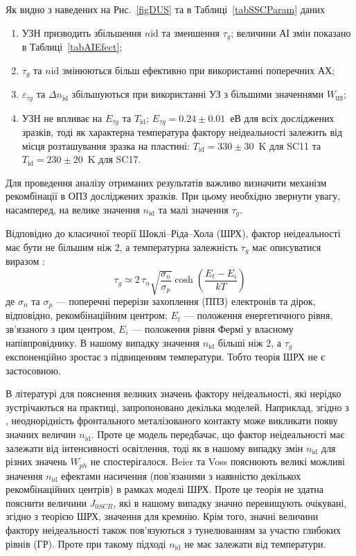 Як видно з наведених на Рис.~\ref{figDUS} та в Таблиці~\ref{tabSSCParam} даних
\begin{enumerate}[label=\asbuk*),leftmargin=0em,itemindent=1.5em]
\item УЗН призводить збільшення $n\mathrm{id}$ та зменшення $\tau_{g}$;
   величини АІ змін показано в Таблиці~\ref{tabAIEfect};
\item $\tau_{g}$ та $n\mathrm{id}$ змінюються більш ефективно при використанні поперечних АХ;
\item $\varepsilon_{\tau g}$ та $\Delta n_\mathrm{id}$ збільшуються при використанні УЗ з більшими значеннями $W_{\mathtt{US}}$;
\item УЗН не впливає на $E_{\tau g}$ та $T_\mathrm{id}$;
 $E_{\tau g}=0.24\pm0.01$~еВ для всіх досліджених зразків,
 тоді як характерна температура фактору неідеальності залежить від місця розташування зразка на пластині: $T_\mathrm{id}=330\pm30$~K для SC11 та $T_\mathrm{id}=230\pm20$~K для SC17.
\end{enumerate}

Для проведення аналізу отриманих результатів важливо визначити механізм рекомбінації в ОПЗ досліджених зразків.
При цьому необхідно звернути увагу, насамперед, на велике значення  $n_{\mathrm{id}}$ та малі значення $\tau_g$.

Відповідно до класичної теорії Шоклі--Ріда--Хола (ШРХ),
фактор неідеальності має бути не більшим ніж 2, а температурна залежність $\tau_g$ має описуватися виразом \cite{TAUg:Schroder,TAUg:Aharoni}:
\begin{equation}
  \tau_g\simeq2\,\tau_n\sqrt{\frac{\sigma_n}{\sigma_p}}\cosh\left(\frac{E_t-E_i}{kT}\right)
\end{equation}
де
$\sigma_n$ та $\sigma_p$ --- поперечні перерізи захоплення (ППЗ) електронів та дірок, відповідно,
рекомбінаційним центром;
$E_t$ --- положення енергетичного рівня, зв'язаного з цим центром,
$E_i$  --- положення рівня Фермі у власному напівпровіднику.
В нашому випадку значення $n_{\mathrm{id}}$ більші ніж 2,
а $\tau_g$ експоненційно зростає з підвищенням температури.
Тобто теорія ШРХ не є застосовною.

В літературі для пояснення великих значень фактору неідеальності, які нерідко зустрічаються на практиці,
запропоновано декілька моделей.
Наприклад, згідно з \cite{Heide}, неоднорідність фронтального металізованого контакту може викликати появу значних величин $n_\mathrm{id}$.
Проте це модель передбачає, що фактор неідеальності має залежати від інтенсивності освітлення, тоді як в нашому випадку змін $n_\mathrm{id}$ для різних
значень $W_{ph}$ не спостерігалося.
Beier та Voss \cite{Beier} пояснюють великі можливі значення $n_\mathrm{id}$ ефектами насичення (пов'язаними з наявністю декількох
рекомбінаційних центрів) в рамках моделі ШРХ.
Проте це теорія не здатна пояснити величини $J_{0SCR}$, які в нашому випадку значно перевищують очікувані, згідно з теорією ШРХ, значення для кремнію.
Крім того, значні величини фактору неідеальності також пов'язуються з тунелюванням за участю глибоких рівнів (ГР)\cite{Shah,Kaminski_n}.
Проте при такому підході $n_\mathrm{id}$ не має залежати від температури.

